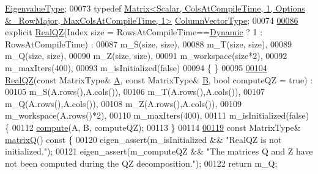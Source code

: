\begin{DoxyCode}
       \hyperlink{group___core___module}{EigenvalueType};
00073       \textcolor{keyword}{typedef} 
      \hyperlink{group___core___module}{Matrix<Scalar, ColsAtCompileTime, 1, Options & ~RowMajor, MaxColsAtCompileTime, 1>}
       \hyperlink{group___core___module}{ColumnVectorType};
00074 
\hyperlink{group___eigenvalues___module_ad8fb9235870a8361a2fdd8dcc2e80d01}{00086}       \textcolor{keyword}{explicit} \hyperlink{group___eigenvalues___module_ad8fb9235870a8361a2fdd8dcc2e80d01}{RealQZ}(Index size = RowsAtCompileTime==\hyperlink{namespace_eigen_ad81fa7195215a0ce30017dfac309f0b2}{Dynamic} ? 1 : RowsAtCompileTime) :
00087         m\_S(size, size),
00088         m\_T(size, size),
00089         m\_Q(size, size),
00090         m\_Z(size, size),
00091         m\_workspace(size*2),
00092         m\_maxIters(400),
00093         m\_isInitialized(false)
00094         \{ \}
00095 
\hyperlink{group___eigenvalues___module_ac6e41c839f8dae31c9a3906ea7540119}{00104}       \hyperlink{group___eigenvalues___module_ac6e41c839f8dae31c9a3906ea7540119}{RealQZ}(\textcolor{keyword}{const} MatrixType& \hyperlink{group___core___module_class_eigen_1_1_matrix}{A}, \textcolor{keyword}{const} MatrixType& \hyperlink{group___core___module_class_eigen_1_1_matrix}{B}, \textcolor{keywordtype}{bool} computeQZ = \textcolor{keyword}{true}) :
00105         m\_S(A.rows(),A.cols()),
00106         m\_T(A.rows(),A.cols()),
00107         m\_Q(A.rows(),A.cols()),
00108         m\_Z(A.rows(),A.cols()),
00109         m\_workspace(A.rows()*2),
00110         m\_maxIters(400),
00111         m\_isInitialized(false) \{
00112           \hyperlink{group___eigenvalues___module_a2b6847964d9f1903193cc3e67c196849}{compute}(A, B, computeQZ);
00113         \}
00114 
\hyperlink{group___eigenvalues___module_a212bc2f69ea4eff830fde70e209e40fb}{00119}       \textcolor{keyword}{const} MatrixType& \hyperlink{group___eigenvalues___module_a212bc2f69ea4eff830fde70e209e40fb}{matrixQ}()\textcolor{keyword}{ const }\{
00120         eigen\_assert(m\_isInitialized && \textcolor{stringliteral}{"RealQZ is not initialized."});
00121         eigen\_assert(m\_computeQZ && \textcolor{stringliteral}{"The matrices Q and Z have not been computed during the QZ
       decomposition."});
00122         \textcolor{keywordflow}{return} m\_Q;

\end{DoxyCode}
